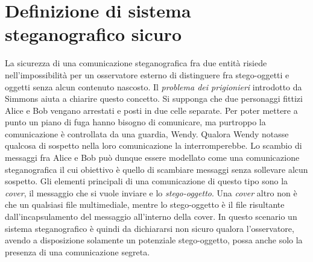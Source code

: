 	\chapter{Definizione di sistema steganografico sicuro}
		La sicurezza di una comunicazione steganografica fra due entità risiede nell'impossibilità per un osservatore esterno di distinguere fra stego-oggetti e oggetti senza alcun contenuto nascosto. Il \textit{problema dei prigionieri} introdotto da Simmons \cite{simmons} aiuta a chiarire questo concetto. Si supponga che due personaggi fittizi Alice e Bob vengano arrestati e posti in due celle separate. Per poter mettere a punto un piano di fuga hanno bisogno di comunicare, ma purtroppo la comunicazione è controllata da una guardia, Wendy. Qualora Wendy notasse qualcosa di sospetto nella loro comunicazione la interromperebbe. Lo scambio di messaggi fra Alice e Bob può dunque essere modellato come una comunicazione steganografica il cui obiettivo è quello di scambiare messaggi senza sollevare alcun sospetto. Gli elementi principali di una comunicazione di questo tipo sono la \textit{cover}, il messaggio che si vuole inviare e lo \textit{stego-oggetto}. Una \textit{cover} altro non è che un qualsiasi file multimediale, mentre lo stego-oggetto è il file risultante dall'incapsulamento del messaggio all'interno della cover. In questo scenario un sistema steganografico è quindi da dichiararsi non sicuro qualora l'osservatore, avendo a disposizione solamente un potenziale stego-oggetto, possa anche solo  la presenza di una comunicazione segreta.

